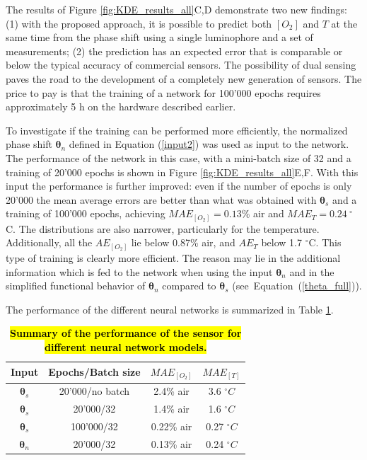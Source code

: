 \documentclass[sensors,article,accept,moreauthors,pdftex,10pt,a4paper]{Definitions/mdpi}
\begin{document}
The results of Figure \ref{fig:KDE_results_all}C,D demonstrate two new findings: (1) with the proposed approach, it is possible to predict both $[O_2]$ and $T$ at the same time from the phase shift using a single luminophore and a set of measurements; (2) the prediction has an expected error that is comparable or below the typical accuracy of commercial sensors. The possibility of dual sensing paves the road to the development of a completely new generation of sensors.
The price to pay is that the training of a network for 100'000 epochs requires approximately 5 h on the hardware described earlier.

To investigate if the training can be performed more efficiently, the normalized phase shift ${\pmb \theta}_n$ defined in Equation (\ref{input2}) was used as input to the network. The performance of the network in this case, with a mini-batch size of 32 and a training of 20'000 epochs is shown in Figure \ref{fig:KDE_results_all}E,F. With this input the performance is further improved: even if the number of epochs is only 20'000 the mean average errors are better than what was obtained with ${\pmb \theta}_s$ and a training of 100'000 epochs, achieving $MAE_{[O_2]}=0.13$\% air and $MAE_{T}=0.24 \ ^\circ$C. The distributions are also narrower, particularly for the temperature. Additionally, all the $AE_{[O_2]}$ lie below 0.87\% air, and  $AE_{T}$ below 1.7 $^\circ$C. This type of training is clearly more efficient. The reason may lie in the additional information which is fed to the network when using the input ${\pmb \theta}_n$ and in the simplified functional behavior of ${\pmb \theta}_n$ compared to ${\pmb \theta}_s$ (see~Equation~(\ref{theta_full})).


The performance of the different neural networks is summarized in Table \ref{TableMAE_summary}. 
\begin{table}[H]
\centering
\caption {\bf \hl{Summary of the performance of the sensor for different neural network models.}} %
\label{TableMAE_summary}
\begin{tabular}{ cccc}

\toprule
 \textbf{Input} & \textbf{Epochs/Batch size} & \boldmath$MAE_{[O_2]}$ & \boldmath$MAE_{[T]}$  \\ 
 \midrule
${\pmb \theta}_s$ & 20'000/\textrm{no batch} & 2.4\% air & 3.6 $^\circ C$\\ 
${\pmb \theta}_s$ & 20'000/32 & 1.4\% air & 1.6 $^\circ C$\\ 
${\pmb \theta}_s$& 100'000/32 & 0.22\% air & 0.27 $^\circ C$\\ 
${\pmb \theta}_n$ & 20'000/32 & 0.13\% air & 0.24 $^\circ C$\\ 
\bottomrule
\end{tabular}

\end{table}
\end{document}
